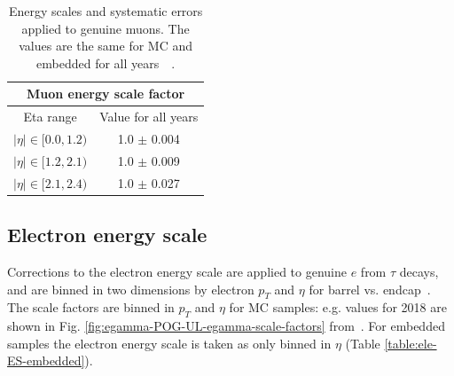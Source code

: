 \begin{table}[ht]
    \centering
    \begin{tabular}{|c|c|}
    \hline
    \multicolumn{2}{|c|}{Muon energy scale factor}      \\ \hline
    \hline
    Eta range                & Value for all years \\ \hline
    $|\eta| \in [0.0, 1.2)$  & 1.0 $\pm$ 0.004 \\
    $|\eta| \in [1.2, 2.1)$  & 1.0 $\pm$ 0.009 \\
    $|\eta| \in [2.1, 2.4)$  & 1.0 $\pm$ 0.027 \\
    \hline
    \end{tabular}
    \caption[Energy scales and systematic errors applied to genuine muons.]{Energy scales and systematic errors applied to genuine muons. The values are the same for MC and embedded for all years~\cite{twiki_HiggsToTauTauWorkingLegacyRun2}~\cite{twiki_MUO_simplified_ES}.}
    \label{table:muon-ES}
\end{table}


\subsection{Electron energy scale}
\label{sec:electron_energy_scale}

Corrections to the electron energy scale are applied to genuine $e$ from $\tau$ decays, and are binned in two dimensions by electron $p_{T}$ and $\eta$ for barrel vs. endcap~\cite{twiki_Electron_POG_recommendation}. The scale factors are binned in $p_{T}$ and $\eta$ for MC samples: e.g. values for 2018 are shown in Fig. \ref{fig:egamma-POG-UL-egamma-scale-factors} from~\cite{twiki_Electron_UL_2016_2017_2018}. For embedded samples the electron energy scale is taken as only binned in $\eta$ (Table \ref{table:ele-ES-embedded}).

